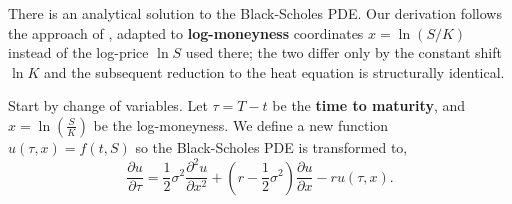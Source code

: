 There is an analytical solution to the Black-Scholes PDE.
Our derivation follows the approach of \cite[Ch. 11.4]{steele_stochastic},
adapted to \textbf{log-moneyness} coordinates $x = \ln(S/K)$ instead of the log-price $\ln S$ used there;
the two differ only by the constant shift $\ln K$ and the subsequent reduction to the heat equation is structurally identical.

Start by change of variables.
Let $\tau = T - t$ be the \textbf{time to maturity},
and $x = \ln{\left( \frac{S}{K} \right)}$ be the log-moneyness.
We define a new function $u(\tau, x) = f(t, S)$ so the Black-Scholes PDE is transformed to,
\begin{equation*}
    \frac{\partial u}{\partial \tau} =
        \frac{1}{2} \sigma^2 \frac{\partial^2 u}{\partial x^2}
        + \left(r - \frac{1}{2} \sigma^2  \right) \frac{\partial u}{\partial x} 
        - r u(\tau, x).
\end{equation*}

